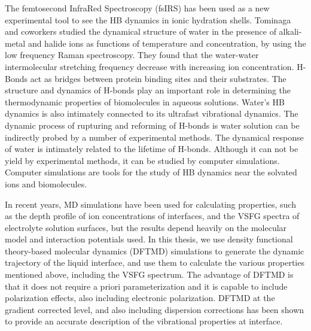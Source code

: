 The femtosecond InfraRed Spectroscopy (fsIRS) has been used as a new experimental tool to see the HB dynamics in ionic hydration shells\cite{Laage2007}. 
Tominaga and coworkers studied the dynamical structure of water in the presence of alkali-metal and halide ions as functions of temperature and concentration, 
by using the low frequency Raman spectroscopy. 
They found that the water-water intermolecular stretching frequency decrease with increasing ion concentration\cite{KM98,Amo00}.
H-Bonds act as bridges between protein binding sites and their substrates\cite{Ball05}.
The structure and dynamics of H-bonds play an important role in determining the thermodynamic properties of biomolecules in aqueous solutions\cite{HX01}. 
Water’s HB dynamics is also intimately connected to its ultrafast vibrational dynamics\cite{Nagata15}. 
The dynamic process of rupturing and reforming of H-bonds is water solution can be indirectly probed by a number of experimental methods\cite{OC84,JT85}.
The dynamical response of water is intimately related to the lifetime of H-bonds\cite{SP05}. 
Although it can not be yield by experimental methods, it can be studied by computer simulations\cite{Rapaport1983,Voloshin2009}.
Computer simulations are tools for the study of HB dynamics near the solvated ions and biomolecules\cite{PJR79,YKC98}.

In recent years, MD simulations have been used for calculating properties, 
such as the depth profile of ion concentrations of interfaces\cite{Jungwirth2001,Jungwirth2002}, and the VSFG spectra 
of electrolyte solution surfaces\cite{Gopalakrishnan2006,Johnson2014,Ishiyama2014,Ishiyama2017},
but the results depend heavily on the molecular model and interaction potentials used\cite{LXD03,MKP04,TI07,MM05}.
In this thesis, we use density functional theory-based molecular dynamics (DFTMD) simulations to generate the dynamic trajectory of 
the liquid interface, and use them to calculate the various properties mentioned above, including the VSFG spectrum.  
The advantage of DFTMD is that it does not require a priori parameterization and it is capable to include polarization effects\cite{Ufimtsev2011},
also including electronic polarization. DFTMD at the gradient corrected level, and also including dispersion corrections\cite{Grimme04,Grimme06,Grimme07,Grimme10,Baer2011}
has been shown to provide an accurate description of the vibrational properties at interface\cite{Fornaro2015}.


